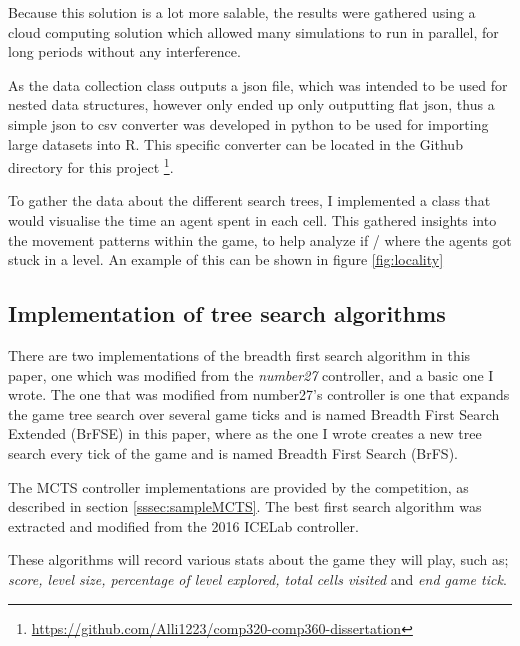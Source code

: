 \documentclass[journal]{IEEEtran}
\begin{document}
	Because this solution is a lot more salable, the results were gathered using a cloud computing solution which allowed many simulations to run in parallel, for long periods without any interference.
	

	As the data collection class outputs a json file, which was intended to be used for nested data structures, however only ended up only outputting flat json, thus a simple json to csv converter was developed in python to be used for importing large datasets into R. This specific converter can be located in the Github directory for this project \footnote{\url{https://github.com/Alli1223/comp320-comp360-dissertation}}.

	To gather the data about the different search trees, I implemented a class that would visualise the time an agent spent in each cell. 
	This gathered insights into the movement patterns within the game, to help analyze if / where the agents got stuck in a level. An example of this can be shown in figure \ref{fig:locality}

	
	\subsection{Implementation of tree search algorithms} \label{TSImplementation}
	There are two implementations of the breadth first search algorithm in this paper, one which was modified from the \textit{number27} controller, and  a basic one I wrote. The one that was modified from number27's controller is one that expands the game tree search over several game ticks and is named Breadth First Search Extended (BrFSE) in this paper, where as the one I wrote creates a new tree search every tick of the game and is named Breadth First Search (BrFS).
	
	The MCTS controller implementations are provided by the competition, as described in section \ref{sssec:sampleMCTS}.
	The best first search algorithm was extracted and modified from the 2016 ICELab controller.

	These algorithms will record various stats about the game they will play, such as; \textit{score, level size, percentage of level explored, total cells visited} and \textit{end game tick}.
	
	


		
\end{document}
